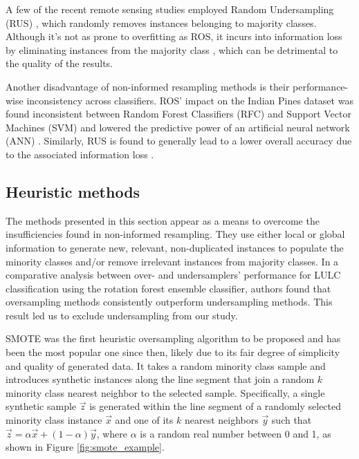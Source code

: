 \documentclass[preprint,12pt]{elsarticle}
\begin{document}
A few of the recent remote sensing studies employed Random Undersampling (RUS)
\cite{Ferreira2019}, which randomly removes instances belonging to majority
classes. Although it's not as prone to overfitting as ROS, it incurs into
information loss by eliminating instances from the majority class
\cite{Feng2019}, which can be detrimental to the quality of the results.

Another disadvantage of non-informed resampling methods is their
performance-wise inconsistency across classifiers. ROS' impact on the Indian
Pines dataset was found inconsistent between Random Forest Classifiers (RFC)
and Support Vector Machines (SVM) and lowered the predictive power of an
artificial neural network (ANN) \cite{Maxwell2018}. Similarly, RUS is found to
generally lead to a lower overall accuracy due to the associated information
loss \cite{Maxwell2018}.

\subsection{Heuristic methods}

The methods presented in this section appear as a means to overcome the
insufficiencies found in non-informed resampling. They use either local or
global information to generate new, relevant, non-duplicated instances to
populate the minority classes and/or remove irrelevant instances from majority
classes. In a comparative analysis between over- and undersamplers' performance
for LULC classification \cite{Feng2018} using the rotation forest ensemble
classifier, authors found that oversampling methods consistently outperform
undersampling methods. This result led us to exclude undersampling from our
study.

SMOTE \cite{Chawla2002} was the first heuristic oversampling algorithm to be
proposed and has been the most popular one since then, likely due to its fair
degree of simplicity and quality of generated data. It takes a random minority
class sample and introduces synthetic instances along the line segment that
join a random $k$ minority class nearest neighbor to the selected sample.
Specifically, a single synthetic sample $\overrightarrow{z}$ is generated
within the line segment of a randomly selected minority class
instance $\overrightarrow{x}$ and one of its $k$ nearest
neighbors $\overrightarrow{y}$ such that $\overrightarrow{z} =
\alpha\overrightarrow{x}+(1-\alpha)\overrightarrow{y}$, where $\alpha$ is a
random real number between 0 and 1, as shown in
Figure \ref{fig:smote_example}.
\end{document}
